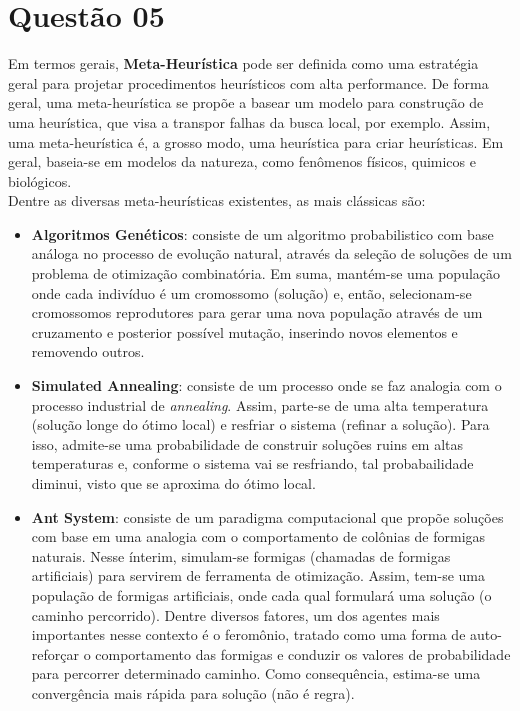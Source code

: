 	\section*{Questão 05}
	Em termos gerais, \textbf{Meta-Heurística} pode ser definida como uma estratégia geral para projetar procedimentos heurísticos com alta performance. De forma geral, uma meta-heurística se propõe a basear um modelo para construção de uma heurística, que visa a transpor falhas da busca local, por exemplo. Assim, uma meta-heurística é, a grosso modo, uma heurística para criar heurísticas. Em geral, baseia-se em modelos da natureza, como fenômenos físicos, quimicos e biológicos.\\
	Dentre as diversas meta-heurísticas existentes, as mais clássicas são:
	\begin{itemize}
		\item \textbf{Algoritmos Genéticos}: consiste de um algoritmo probabilistico com base análoga no processo de evolução natural, através da seleção de soluções de um problema de otimização combinatória. Em suma, mantém-se uma população onde cada indivíduo é um cromossomo (solução) e, então, selecionam-se cromossomos reprodutores para gerar uma nova população através de um cruzamento e posterior possível mutação, inserindo novos elementos e removendo outros.
		\item \textbf{Simulated Annealing}: consiste de um processo onde se faz analogia com o processo industrial de \textit{annealing}. Assim, parte-se de uma alta temperatura (solução longe do ótimo local) e resfriar o sistema (refinar a solução). Para isso, admite-se uma probabilidade de construir soluções ruins em altas temperaturas e, conforme o sistema vai se resfriando, tal probabailidade diminui, visto que se aproxima do ótimo local.
		\item \textbf{Ant System}: consiste de um paradigma computacional que propõe soluções com base em uma analogia com o comportamento de colônias de formigas naturais. Nesse ínterim, simulam-se formigas (chamadas de formigas artificiais) para servirem de ferramenta de otimização. Assim, tem-se uma população de formigas artificiais, onde cada qual formulará uma solução (o caminho percorrido). Dentre diversos fatores, um dos agentes mais importantes nesse contexto é o feromônio, tratado como uma forma de auto-reforçar o comportamento das formigas e conduzir os valores de probabilidade para percorrer determinado caminho. Como consequência, estima-se uma convergência mais rápida para solução (não é regra).
	\end{itemize}

